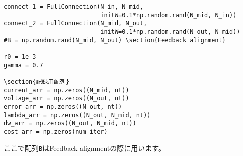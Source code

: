 \begin{verbatim}
connect_1 = FullConnection(N_in, N_mid, 
                           initW=0.1*np.random.rand(N_mid, N_in))
connect_2 = FullConnection(N_mid, N_out, 
                           initW=0.1*np.random.rand(N_out, N_mid))
#B = np.random.rand(N_mid, N_out) \section{Feedback alignment}

r0 = 1e-3
gamma = 0.7

\section{記録用配列}
current_arr = np.zeros((N_mid, nt))
voltage_arr = np.zeros((N_out, nt))
error_arr = np.zeros((N_out, nt))
lambda_arr = np.zeros((N_out, N_mid, nt))
dw_arr = np.zeros((N_out, N_mid, nt))
cost_arr = np.zeros(num_iter)
\end{verbatim}
ここで配列\texttt{B}はFeedback alignmentの際に用います。
